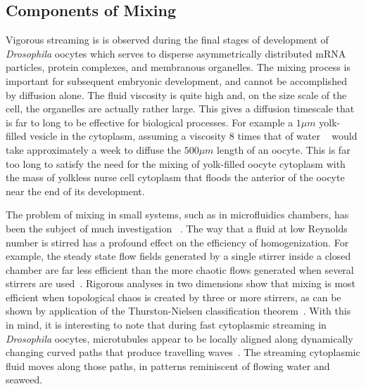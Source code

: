\documentclass[11pt]{ucthesis}
\begin{document}
\subsection{Components of Mixing}


Vigorous streaming is is observed during the final stages of
development of {\em Drosophila} oocytes which serves to disperse asymmetrically
distributed mRNA particles, protein complexes, and membranous
organelles.  The mixing process is important for subsequent
embryonic development, and cannot be accomplished by
diffusion alone.  
The fluid viscosity is quite high and, on the size scale of the cell, the organelles are actually rather large. 
This gives a diffusion timescale that is far to long to be effective for biological processes. 
For example  a $ 1\mu m$ yolk-filled vesicle in
the cytoplasm, assuming a viscosity 8 times that of water ~\cite{LubyPhelps}
would take approximately a week to diffuse the $500 \mu m$  length
of an oocyte. This is far too long to satisfy the need for the mixing
of yolk-filled oocyte cytoplasm with the mass of yolkless nurse
cell cytoplasm that floods the anterior of the oocyte near the
end of its development.

The problem of mixing in small systems, such as in microfluidics
chambers, has been the subject of much investigation ~\cite{Squires}. The
way that a fluid at low Reynolds number is stirred has a
profound effect on the efficiency of homogenization. For
example,  the steady state flow fields generated by a single
stirrer inside a closed chamber are far less efficient than
the more chaotic flows generated when  several stirrers are used~\cite{Aref,Aref2000}.
Rigorous analyses in two dimensions show that mixing is
most efficient when topological chaos is created by three or more
stirrers, as can be shown by application of the Thurston-Nielsen
classification theorem~\cite{Thurston,Fathi,Handel}.  With this in mind, it is
interesting to note that during fast cytoplasmic streaming in
{\em Drosophila} oocytes, microtubules appear to be locally aligned
along dynamically changing curved paths that produce travelling
waves~\cite{SerbusSaxton}.  
The streaming cytoplasmic fluid moves along those paths, in patterns reminiscent
of flowing water and seaweed.
\end{document}
